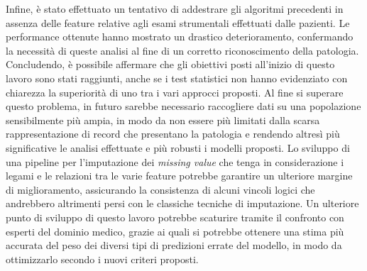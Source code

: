 Infine, è stato effettuato un tentativo di addestrare gli algoritmi precedenti in assenza delle feature relative agli esami strumentali effettuati dalle pazienti. Le performance ottenute hanno mostrato un drastico deterioramento, confermando la necessità di queste analisi al fine di un corretto riconoscimento della patologia.
Concludendo, è possibile affermare che gli obiettivi posti all'inizio di questo lavoro sono stati raggiunti, anche se i test statistici non hanno evidenziato con chiarezza la superiorità di uno tra i vari approcci proposti.
Al fine si superare questo problema, in futuro sarebbe necessario raccogliere dati su una popolazione sensibilmente più ampia, in modo da non essere più limitati dalla scarsa rappresentazione di record che presentano la patologia e rendendo altresì più significative le analisi effettuate e più robusti i modelli proposti.
Lo sviluppo di una pipeline per l'imputazione dei \textit{missing value} che tenga in considerazione i legami e le relazioni tra le varie feature potrebbe garantire un ulteriore margine di miglioramento, assicurando la consistenza di alcuni vincoli logici che andrebbero altrimenti persi con le classiche tecniche di imputazione.
Un ulteriore punto di sviluppo di questo lavoro potrebbe scaturire tramite il confronto con esperti del dominio medico, grazie ai quali si potrebbe ottenere una stima più accurata del peso dei diversi tipi di predizioni errate del modello, in modo da ottimizzarlo secondo i nuovi criteri proposti.
